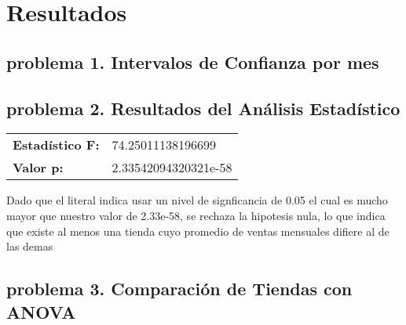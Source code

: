 
\section{Resultados}

\subsection{problema 1. Intervalos de Confianza por mes}


\subsection{problema 2. Resultados del Análisis Estadístico}

\begin{flushleft}
\begin{tabular}{l l}
\textbf{Estadístico F:} & 74.25011138196699 \\
\textbf{Valor p:} & 2.33542094320321e-58 \\
\end{tabular}
\end{flushleft}

Dado que el literal indica usar un nivel de signficancia de 0.05 el cual es mucho mayor que nuestro valor de 2.33e-58, se rechaza la hipotesis nula, lo que indica que existe al menos una tienda cuyo promedio de ventas mensuales difiere al de las demas 


\subsection{problema 3. Comparación de Tiendas con ANOVA}
